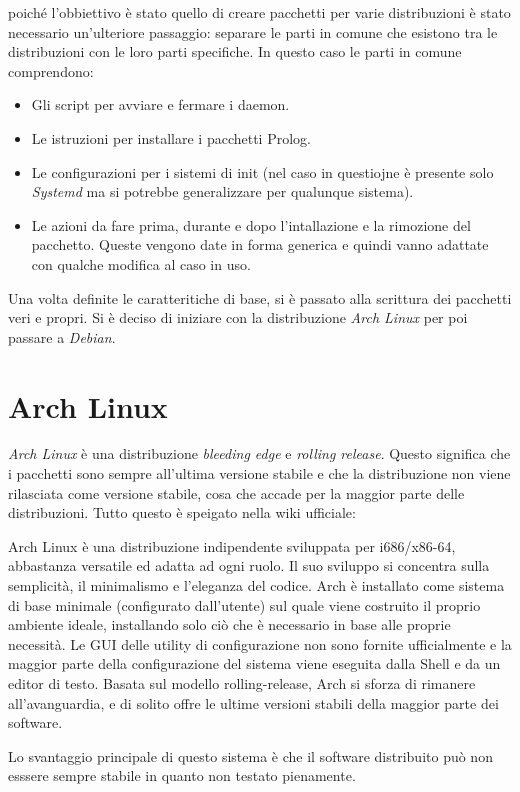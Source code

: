 \documentclass[10pt,titlepage,twoside,a4paper]{report}
\begin{document}
poiché l'obbiettivo è stato quello di creare pacchetti per varie 
distribuzioni è stato necessario un'ulteriore passaggio: separare le parti in 
comune che esistono tra le distribuzioni con le loro parti specifiche. In 
questo caso le parti in comune comprendono:
\begin{itemize}
    \item Gli script per avviare e fermare i daemon.
    \item Le istruzioni per installare i pacchetti Prolog.
    \item Le configurazioni per i sistemi di init (nel caso in questiojne è 
presente solo \emph{Systemd} ma si potrebbe generalizzare per qualunque 
sistema).
    \item Le azioni da fare prima, durante e dopo l'intallazione e la rimozione 
del pacchetto. Queste vengono date in forma generica e quindi vanno adattate 
con qualche modifica al caso in uso.
\end{itemize}

Una volta definite le caratteritiche di base, si è passato alla scrittura dei
pacchetti veri e propri. Si è deciso di iniziare con la
distribuzione \emph{Arch Linux} per poi passare a \emph{Debian}.


\section{Arch Linux}
\emph{Arch Linux} è una distribuzione \emph{bleeding edge} e \emph{rolling 
release}. Questo significa che i pacchetti sono sempre all'ultima versione 
stabile e che la distribuzione non viene rilasciata come versione stabile, 
cosa che accade per la maggior parte delle distribuzioni. Tutto questo è 
speigato nella wiki ufficiale\cite{archLinux}:
\begin{displayquote}
Arch Linux è una distribuzione indipendente sviluppata per i686/x86-64, 
abbastanza versatile ed adatta ad ogni ruolo. Il suo sviluppo si concentra 
sulla semplicità, il minimalismo e l'eleganza del codice. Arch è installato 
come sistema di base minimale (configurato dall'utente) sul quale viene 
costruito il proprio ambiente ideale, installando solo ciò che è necessario 
in base alle proprie necessità. Le GUI delle utility di configurazione non 
sono fornite ufficialmente e la maggior parte della configurazione del sistema viene 
eseguita dalla Shell e da un editor di testo. Basata sul modello 
rolling-release, Arch si sforza di rimanere all'avanguardia, e di solito offre 
le ultime versioni stabili della maggior parte dei software.
\end{displayquote}
Lo svantaggio principale di questo sistema è che il software distribuito 
può non esssere sempre stabile in quanto non testato pienamente.
\end{document}
